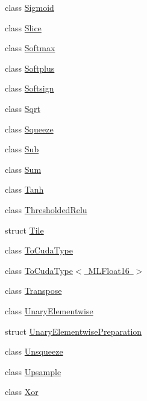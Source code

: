 \begin{DoxyCompactItemize}
\item 
class \mbox{\hyperlink{classonnxruntime_1_1cuda_1_1Sigmoid}{Sigmoid}}
\item 
class \mbox{\hyperlink{classonnxruntime_1_1cuda_1_1Slice}{Slice}}
\item 
class \mbox{\hyperlink{classonnxruntime_1_1cuda_1_1Softmax}{Softmax}}
\item 
class \mbox{\hyperlink{classonnxruntime_1_1cuda_1_1Softplus}{Softplus}}
\item 
class \mbox{\hyperlink{classonnxruntime_1_1cuda_1_1Softsign}{Softsign}}
\item 
class \mbox{\hyperlink{classonnxruntime_1_1cuda_1_1Sqrt}{Sqrt}}
\item 
class \mbox{\hyperlink{classonnxruntime_1_1cuda_1_1Squeeze}{Squeeze}}
\item 
class \mbox{\hyperlink{classonnxruntime_1_1cuda_1_1Sub}{Sub}}
\item 
class \mbox{\hyperlink{classonnxruntime_1_1cuda_1_1Sum}{Sum}}
\item 
class \mbox{\hyperlink{classonnxruntime_1_1cuda_1_1Tanh}{Tanh}}
\item 
class \mbox{\hyperlink{classonnxruntime_1_1cuda_1_1ThresholdedRelu}{Thresholded\+Relu}}
\item 
struct \mbox{\hyperlink{structonnxruntime_1_1cuda_1_1Tile}{Tile}}
\item 
class \mbox{\hyperlink{classonnxruntime_1_1cuda_1_1ToCudaType}{To\+Cuda\+Type}}
\item 
class \mbox{\hyperlink{classonnxruntime_1_1cuda_1_1ToCudaType_3_01MLFloat16_01_4}{To\+Cuda\+Type$<$ M\+L\+Float16 $>$}}
\item 
class \mbox{\hyperlink{classonnxruntime_1_1cuda_1_1Transpose}{Transpose}}
\item 
class \mbox{\hyperlink{classonnxruntime_1_1cuda_1_1UnaryElementwise}{Unary\+Elementwise}}
\item 
struct \mbox{\hyperlink{structonnxruntime_1_1cuda_1_1UnaryElementwisePreparation}{Unary\+Elementwise\+Preparation}}
\item 
class \mbox{\hyperlink{classonnxruntime_1_1cuda_1_1Unsqueeze}{Unsqueeze}}
\item 
class \mbox{\hyperlink{classonnxruntime_1_1cuda_1_1Upsample}{Upsample}}
\item 
class \mbox{\hyperlink{classonnxruntime_1_1cuda_1_1Xor}{Xor}}
\end{DoxyCompactItemize}
